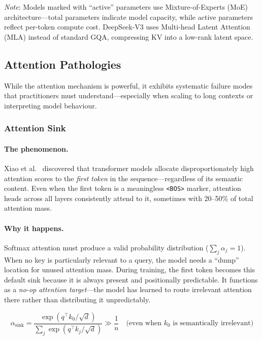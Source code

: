 \emph{Note}: Models marked with ``active'' parameters use Mixture-of-Experts (MoE) architecture---total parameters indicate model capacity, while active parameters reflect per-token compute cost. DeepSeek-V3 uses Multi-head Latent Attention (MLA) instead of standard GQA, compressing KV into a low-rank latent space.

\subsection{Attention Pathologies}
\label{attention-pathologies}

While the attention mechanism is powerful, it exhibits systematic failure modes that practitioners must understand---especially when scaling to long contexts or interpreting model behaviour.

\subsubsection{Attention Sink}
\label{attention-sink}

\paragraph{The phenomenon.}
\label{the-phenomenon.}

Xiao et al.~\cite{xiao2024efficient} discovered that transformer models allocate disproportionately high attention scores to the \emph{first token} in the sequence---regardless of its semantic content. Even when the first token is a meaningless \texttt{<BOS>} marker, attention heads across all layers consistently attend to it, sometimes with 20--50\% of total attention mass.

\paragraph{Why it happens.}
\label{why-it-happens.}

Softmax attention must produce a valid probability distribution ($\sum_j \alpha_j = 1$). When no key is particularly relevant to a query, the model needs a ``dump'' location for unused attention mass. During training, the first token becomes this default sink because it is always present and positionally predictable. It functions as a \emph{no-op attention target}---the model has learned to route irrelevant attention there rather than distributing it unpredictably.

\[
\alpha_{\text{sink}} = \frac{\exp(q^\top k_0 / \sqrt{d})}{\sum_{j} \exp(q^\top k_j / \sqrt{d})} \gg \frac{1}{n} \quad \text{(even when } k_0 \text{ is semantically irrelevant)}
\]

